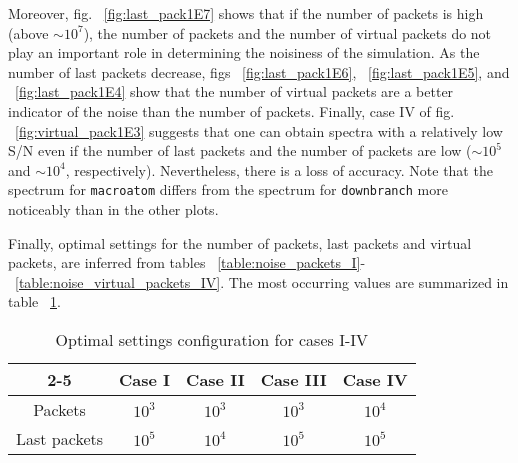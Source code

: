 \documentclass[letterpaper,12pt]{article}
\begin{document}
 Moreover, fig. ~\ref{fig:last_pack1E7} shows that if the number of packets is high (above $\sim 10^7$), the number of packets and the number of virtual packets do not play an important role in determining the noisiness of the simulation. As the number of last packets decrease, figs ~\ref{fig:last_pack1E6},  ~\ref{fig:last_pack1E5}, and  ~\ref{fig:last_pack1E4} show that the number of virtual packets are a better indicator of the noise than the number of packets. Finally, case IV of fig. ~\ref{fig:virtual_pack1E3} suggests that one can obtain spectra with a relatively low S/N even if the number of last packets and the number of packets are low ($\sim 10^5$ and $\sim 10^4$, respectively). Nevertheless, there is a loss of accuracy. Note that the spectrum for \texttt{macroatom} differs from the spectrum for \texttt{downbranch} more noticeably than in the other plots.

Finally, optimal settings for the number of packets, last packets and virtual packets, are inferred from tables ~\ref{table:noise_packets_I}-~\ref{table:noise_virtual_packets_IV}. The most occurring values are summarized in table ~\ref{table:optimal_cases}.  
  
\begin{table}[ht] 
\centering %
\begin{tabular}{|c| c c c c|} %
\cline{2-5}
\cline{2-5}
\multicolumn{1}{c |}{} & \multicolumn{1}{c}{Case I} & \multicolumn{1}{c}{Case II} & \multicolumn{1}{c}{Case III} & \multicolumn{1}{c|}{Case IV}\\ \hline
\hline %
Packets         & $10^3$ & $10^3$ & $10^3$ & $10^4$ \\ %
Last packets    & $10^5$ & $10^4$ & $10^5$ & $10^5$ \\ 
\hline %
\end{tabular} 
\caption{Optimal settings configuration for cases I-IV} %
\label{table:optimal_cases} %
\end{table} 
\end{document}
